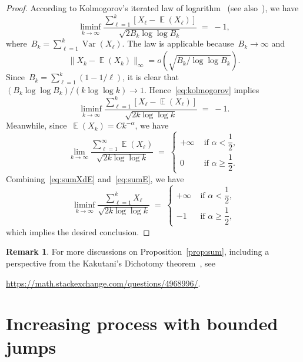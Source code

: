 \documentclass[12pt,a4paper]{article}  %
\newcounter{cite}
\theoremstyle{definition}
\newtheorem{remark}{Remark}[section]
\numberwithin{equation}{section}
\DeclareMathOperator{\var}{Var}
\DeclareMathOperator{\expc}{\mathbb{E}}
\begin{document}
\begin{proof}
According to Kolmogorov's iterated law of logarithm~\cite{Kolmogoroff_1929} (see
also~\cite[Theorems~7.1--7.3]{Petrov_1995}), we have
\begin{equation}
    \label{eq:kolmogorov}
    \liminf_{k\to\infty} \frac{\sum_{\ell=1}^k [X_\ell -\expc(X_\ell)]}{\sqrt{2B_k\log\log B_k}} \; =\; -1,
\end{equation}
where~$B_k = \sum_{\ell=1}^k \var(X_\ell)$. The law is applicable because~$B_k\to \infty$
and
\[
\|X_k-\expc(X_k)\|_\infty = o(\sqrt{B_k/\log\log B_k}).
\]
Since~$B_k = \sum_{\ell=1}^k (1-1/\ell)$, it is clear that~$(B_k \log\log B_k)/(k\log\log k) \to 1$.
Hence~\eqref{eq:kolmogorov} implies
\begin{equation}
    \label{eq:sumXdE}
    \liminf_{k\to\infty} \frac{\sum_{\ell=1}^k [X_\ell -\expc(X_\ell)]}{\sqrt{2k\log\log k}} \; =\; -1.
\end{equation}
Meanwhile, since~$\expc(X_k) = Ck^{-\alpha}$, we have
\begin{equation}
    \label{eq:sumE}
    \lim_{k\to \infty} \frac{\sum_{\ell=1}^\infty \expc(X_\ell)}{\sqrt{2k\log\log k}} \;=\;
    \begin{cases}
        +\infty & \text{ if } \alpha < \dfrac{1}{2}, \\[2ex]
        0 & \text{ if } \alpha \ge \dfrac{1}{2}.
    \end{cases}
\end{equation}
Combining~\eqref{eq:sumXdE} and~\eqref{eq:sumE}, we have
\[
    \liminf_{k\to\infty} \frac{\sum_{\ell=1}^k X_\ell}{\sqrt{2k\log\log k}} \; =\;
    \begin{cases}
        +\infty & \text{ if } \alpha < \dfrac{1}{2}, \\[2ex]
        -1 & \text{ if } \alpha \ge \dfrac{1}{2},
    \end{cases}
    \]
    which implies the desired conclusion.
\end{proof}

\begin{remark}
    \label{rem:ms}
    For more discussions on Proposition~\ref{prop:sum}, including a perspective from the
    Kakutani's Dichotomy theorem~\cite{Kakutani_1948}, see
    \begin{center}
        \url{https://math.stackexchange.com/questions/4968996/}.
    \end{center}
\end{remark}

\section{Increasing process with bounded jumps}
\label{sec:ipbj}
\end{document}

